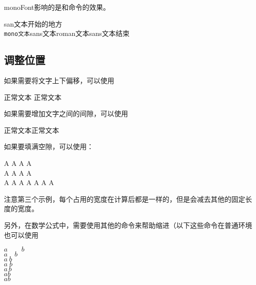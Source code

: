     monoFont影响的是和命令的效果。
    \begin{texshow}
        \sffamily san文本开始的地方\\\texttt{mono文本}\textsf{sans文本}{\rmfamily roman文本}sans文本结束
    \end{texshow}

    \subsection{调整位置}
    如果需要将文字上下偏移，可以使用
    \begin{texshow}
        正常文本 \raisebox{1cm}{提升文本} \raisebox{-1cm}{下降文本}正常文本
    \end{texshow}

    如果需要增加文字之间的间隙，可以使用
    \begin{texshow}
        正常文本\hspace{1em}正常文本\\
    \end{texshow}
    如果要填满空隙，可以使用：
    \begin{texshow}
        A \hfill A \hfill A \hfill A \\
        A  A \hfill A \hfill A \\
        A \hfill A \hfill A\hspace{0.5cm} A \hfill A \hfill A \hspace{0.5cm} A 
    \end{texshow}
    注意第三个示例，每个占用的宽度在计算后都是一样的，但是会减去其他的固定长度的宽度。

    另外，在数学公式中，需要使用其他的命令来帮助缩进（以下这些命令在普通环境也可以使用
    \begin{texshow}
        $a\qquad{}b$\\ %
        $a\quad{}b$\\ %
        $a\ b$\\ %
        $a\;b$\\ %
        $a\,b$\\ %
        $ab$\\ %
        $a\!b$ %
    \end{texshow}


